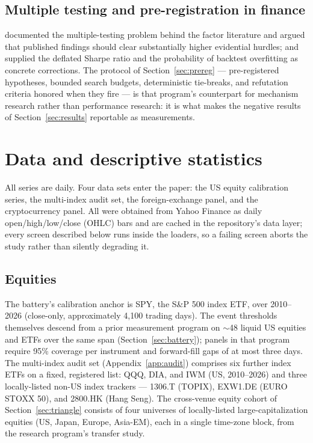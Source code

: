 \documentclass[11pt]{article}
\begin{document}
\subsection{Multiple testing and pre-registration in finance}
\label{sec:related:prereg}

\citet{harvey2016} documented the multiple-testing problem behind the
factor literature and argued that published findings should clear
substantially higher evidential hurdles; \citet{bailey2014} and
\citet{bailey2017} supplied the deflated Sharpe ratio and the probability
of backtest overfitting as concrete corrections. The protocol of
Section~\ref{sec:prereg} --- pre-registered hypotheses, bounded search
budgets, deterministic tie-breaks, and refutation criteria honored when
they fire --- is that program's counterpart for mechanism research rather
than performance research: it is what makes the negative results of
Section~\ref{sec:results} reportable as measurements.

\section{Data and descriptive statistics}
\label{sec:data}

All series are daily. Four data sets enter the paper: the US equity
calibration series, the multi-index audit set, the foreign-exchange panel,
and the cryptocurrency panel. All were obtained from Yahoo Finance as daily
open/high/low/close (OHLC) bars and are cached in the repository's data
layer; every screen described below runs inside the loaders, so a failing
screen aborts the study rather than silently degrading it.

\subsection{Equities}
\label{sec:data:equity}

The battery's calibration anchor is SPY, the S\&P 500 index ETF, over
2010--2026 (close-only, approximately 4{,}100 trading days). The event
thresholds themselves descend from a prior measurement program on
$\sim$48 liquid US equities and ETFs over the same span
(Section~\ref{sec:battery}); panels in that program require 95\% coverage
per instrument and forward-fill gaps of at most three days. The
multi-index audit set (Appendix~\ref{app:audit}) comprises six further
index ETFs on a fixed, registered list: QQQ, DIA, and IWM (US, 2010--2026)
and three locally-listed non-US index trackers --- 1306.T (TOPIX),
EXW1.DE (EURO STOXX 50), and 2800.HK (Hang Seng). The cross-venue equity
cohort of Section~\ref{sec:triangle} consists of four universes of
locally-listed large-capitalization equities (US, Japan, Europe, Asia-EM),
each in a single time-zone block, from the research program's transfer
study.
\end{document}
